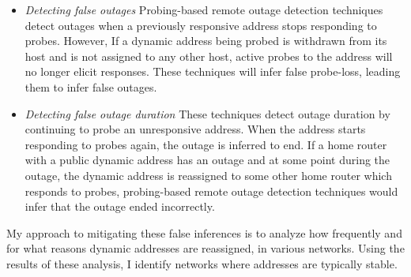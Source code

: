 \begin{itemize}

\item{\emph{Detecting false outages} Probing-based remote outage detection techniques detect outages
    when a previously responsive address stops responding to
    probes. However, If a dynamic address being probed is
withdrawn from its host and is not assigned to any other host, active probes to the address will no longer
elicit responses. These techniques will infer false
probe-loss, leading them to infer false outages.}

\item{\emph{Detecting false outage duration} These techniques detect outage
    duration by continuing to probe an unresponsive address. When the
    address starts responding to probes again, the outage is inferred
    to end. If a home router with a
    public dynamic address has an outage and at some point during the outage,
    the dynamic address is reassigned to some other home router
    which responds to probes, probing-based remote outage detection techniques would infer that the outage ended incorrectly.
}

\end{itemize}

My approach to mitigating these false inferences is to analyze how
frequently and for what reasons dynamic addresses are reassigned, in
various networks. Using the results of these analysis, I identify
networks where addresses are typically stable. 






